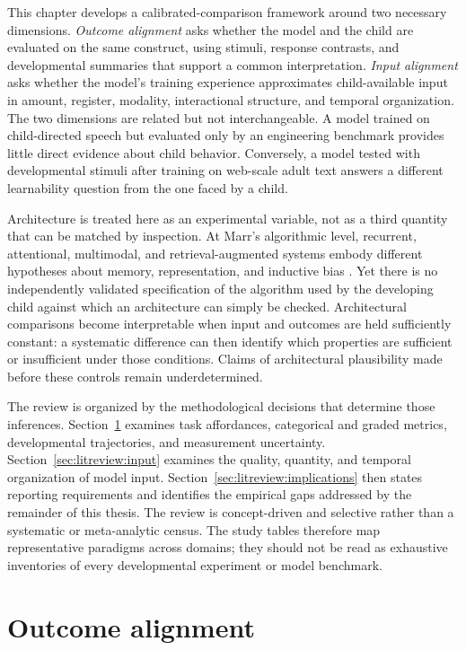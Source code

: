 This chapter develops a calibrated-comparison framework around two necessary dimensions. \emph{Outcome alignment} asks whether the model and the child are evaluated on the same construct, using stimuli, response contrasts, and developmental summaries that support a common interpretation. \emph{Input alignment} asks whether the model's training experience approximates child-available input in amount, register, modality, interactional structure, and temporal organization. The two dimensions are related but not interchangeable. A model trained on child-directed speech but evaluated only by an engineering benchmark provides little direct evidence about child behavior. Conversely, a model tested with developmental stimuli after training on web-scale adult text answers a different learnability question from the one faced by a child.

Architecture is treated here as an experimental variable, not as a third quantity that can be matched by inspection. At Marr's algorithmic level, recurrent, attentional, multimodal, and retrieval-augmented systems embody different hypotheses about memory, representation, and inductive bias \citep{marr_vision_1982}. Yet there is no independently validated specification of the algorithm used by the developing child against which an architecture can simply be checked. Architectural comparisons become interpretable when input and outcomes are held sufficiently constant: a systematic difference can then identify which properties are sufficient or insufficient under those conditions. Claims of architectural plausibility made before these controls remain underdetermined.

The review is organized by the methodological decisions that determine those inferences. Section~\ref{sec:litreview:outcome} examines task affordances, categorical and graded metrics, developmental trajectories, and measurement uncertainty. Section~\ref{sec:litreview:input} examines the quality, quantity, and temporal organization of model input. Section~\ref{sec:litreview:implications} then states reporting requirements and identifies the empirical gaps addressed by the remainder of this thesis. The review is concept-driven and selective rather than a systematic or meta-analytic census. The study tables therefore map representative paradigms across domains; they should not be read as exhaustive inventories of every developmental experiment or model benchmark.


\section{Outcome alignment}
\label{sec:litreview:outcome}

